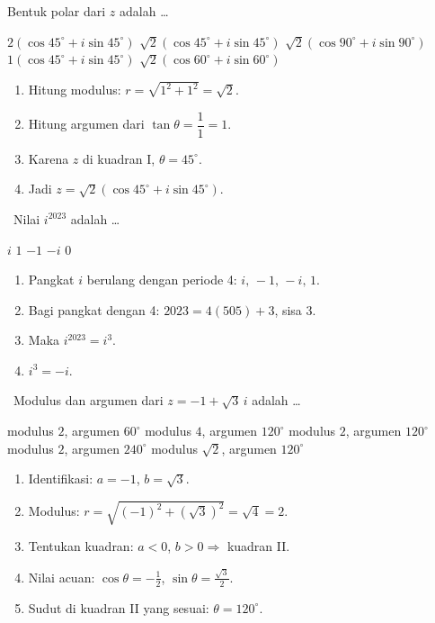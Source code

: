 \documentclass[11pt,a4paper]{exam}
\newenvironment{langkah}{%
  \begin{enumerate}[label=\textbf{Langkah \arabic*:},leftmargin=2.6em,
    itemsep=2pt,topsep=2pt]}{\end{enumerate}}
\newcommand{\Adv}{{\footnotesize\textsf{\textcolor{oranye}{[Advanced]}}}\ }
\newcommand{\Exp}{{\footnotesize\textsf{\textcolor{ungu}{[Expert]}}}\ }
\begin{document}
\begin{questions}
Bentuk polar dari $z$ adalah \dots
\begin{choices}
\choice $2(\cos 45^\circ + i\sin 45^\circ)$
\CorrectChoice $\sqrt{2}(\cos 45^\circ + i\sin 45^\circ)$
\choice $\sqrt{2}(\cos 90^\circ + i\sin 90^\circ)$
\choice $1(\cos 45^\circ + i\sin 45^\circ)$
\choice $\sqrt{2}(\cos 60^\circ + i\sin 60^\circ)$
\end{choices}
\begin{solution}
\begin{langkah}
\item Hitung modulus: $r = \sqrt{1^{2}+1^{2}} = \sqrt2$.
\item Hitung argumen dari $\tan\theta = \dfrac{1}{1} = 1$.
\item Karena $z$ di kuadran I, $\theta = 45^\circ$.
\item Jadi $z = \sqrt2(\cos 45^\circ + i\sin 45^\circ)$.
\end{langkah}
\end{solution}

\question \Adv Nilai $i^{2023}$ adalah \dots
\begin{choices}
\choice $i$ \choice $1$ \choice $-1$ \CorrectChoice $-i$ \choice $0$
\end{choices}
\begin{solution}
\begin{langkah}
\item Pangkat $i$ berulang dengan periode 4: $i,\,-1,\,-i,\,1$.
\item Bagi pangkat dengan 4: $2023 = 4(505) + 3$, sisa 3.
\item Maka $i^{2023} = i^{3}$.
\item $i^{3} = -i$.
\end{langkah}
\end{solution}

\question \Exp Modulus dan argumen dari $z = -1+\sqrt{3}\,i$ adalah \dots
\begin{choices}
\choice modulus $2$, argumen $60^\circ$
\choice modulus $4$, argumen $120^\circ$
\CorrectChoice modulus $2$, argumen $120^\circ$
\choice modulus $2$, argumen $240^\circ$
\choice modulus $\sqrt{2}$, argumen $120^\circ$
\end{choices}
\begin{solution}
\begin{langkah}
\item Identifikasi: $a = -1$, $b = \sqrt3$.
\item Modulus: $r = \sqrt{(-1)^{2}+(\sqrt3)^{2}} = \sqrt{4} = 2$.
\item Tentukan kuadran: $a<0$, $b>0 \Rightarrow$ kuadran II.
\item Nilai acuan: $\cos\theta = -\tfrac12$, $\sin\theta = \tfrac{\sqrt3}{2}$.
\item Sudut di kuadran II yang sesuai: $\theta = 120^\circ$.
\end{langkah}
\end{solution}


\end{questions}
\end{document}
